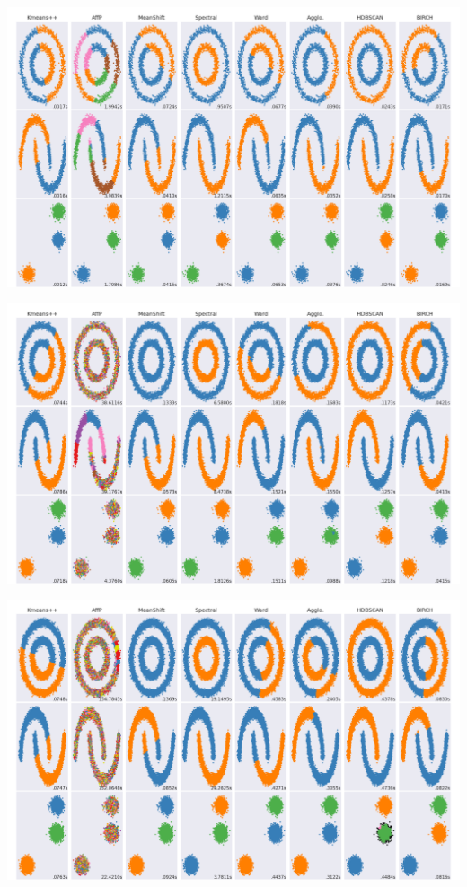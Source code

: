 \documentclass[12pt]{article}
\begin{document}
	\begin{center}
		\begin{minipage}{.8\linewidth}
			\includegraphics[width=\linewidth]{../clustering_result_2000}
		\end{minipage}%
		\hfill
		\begin{minipage}{.8\linewidth}
			\includegraphics[width=\linewidth]{../clustering_result_5000}
		\end{minipage}
	\end{center}

	\begin{center}
		\begin{minipage}{\linewidth}
			\includegraphics[width=\linewidth]{../clustering_result_10000}
		\end{minipage}
	\end{center}
\end{document}

